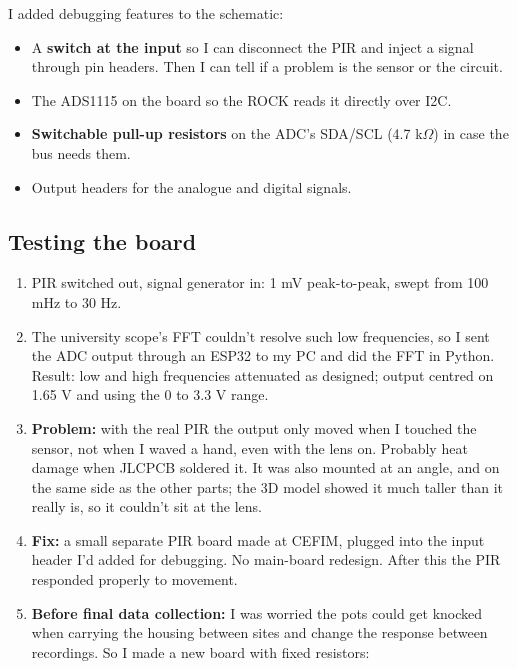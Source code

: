\documentclass[11pt,a4paper]{article}
\providecommand{\tightlist}{\setlength{\itemsep}{0pt}\setlength{\parskip}{0pt}}
\begin{document}
I added debugging features to
the schematic:

\begin{itemize}
\tightlist
\item
  A \textbf{switch at the
  input} so I can disconnect
  the PIR and inject a signal
  through pin headers. Then I
  can tell if a problem is the
  sensor or the circuit.
\item
  The ADS1115 on the board so
  the ROCK reads it directly
  over I2C.
\item
  \textbf{Switchable pull-up
  resistors} on the ADC's
  SDA/SCL (4.7 k$\Omega$) in case the
  bus needs them.
\item
  Output headers for the
  analogue and digital
  signals.
\end{itemize}

\hypertarget{testing-the-board}{%
\subsection{Testing the
board}\label{testing-the-board}}

\begin{enumerate}
\def\labelenumi{\arabic{enumi}.}
\tightlist
\item
  PIR switched out, signal
  generator in: 1 mV
  peak-to-peak, swept from 100
  mHz to 30 Hz.
\item
  The university scope's FFT
  couldn't resolve such low
  frequencies, so I sent the
  ADC output through an ESP32
  to my PC and did the FFT in
  Python. Result: low and high
  frequencies attenuated as
  designed; output centred on
  1.65 V and using the 0 to
  3.3 V range.
\item
  \textbf{Problem:} with the
  real PIR the output only
  moved when I touched the
  sensor, not when I waved a
  hand, even with the lens on.
  Probably heat damage when
  JLCPCB soldered it. It was
  also mounted at an angle,
  and on the same side as the
  other parts; the 3D model
  showed it much taller than
  it really is, so it couldn't
  sit at the lens.
\item
  \textbf{Fix:} a small
  separate PIR board made at
  CEFIM, plugged into the
  input header I'd added for
  debugging. No main-board
  redesign. After this the PIR
  responded properly to
  movement.
\item
  \textbf{Before final data
  collection:} I was worried
  the pots could get knocked
  when carrying the housing
  between sites and change the
  response between recordings.
  So I made a new board with
  fixed resistors:
\end{enumerate}
\end{document}
